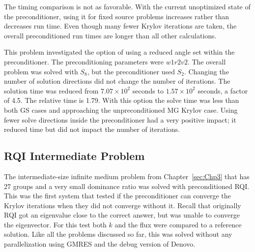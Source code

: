 The timing comparison is not as favorable. With the current unoptimized state of the preconditioner, using it for fixed source problems increases rather than decreases run time. Even though many fewer Krylov iterations are taken, the overall preconditioned run times are longer than all other calculations. 

This problem investigated the option of using a reduced angle set within the preconditioner. The preconditioning parameters were $w1r2v2$. The overall problem was solved with $S_{8}$, but the preconditioner used $S_{2}$. Changing the number of solution directions did not change the number of iterations. The solution time was reduced from $7.07 \times 10^{2}$ seconds to $1.57 \times 10^{2}$ seconds, a factor of 4.5. The relative time is 1.79. With this option the solve time was less than both GS cases and approaching the unpreconditioned MG Krylov case. Using fewer solve directions inside the preconditioner had a very positive impact; it reduced time but did not impact the number of iterations.

\subsection{RQI Intermediate Problem}
The intermediate-size infinite medium problem from Chapter~\ref{sec:Chp3} that has 27 groups and a very small dominance ratio was solved with preconditioned RQI. This was the first system that tested if the preconditioner can converge the Krylov iterations when they did not converge without it. Recall that originally RQI got an eigenvalue close to the correct answer, but was unable to converge the eigenvector. For this test both $k$ and the flux were compared to a reference solution. Like all the problems discussed so far, this was solved without any parallelization using GMRES and the debug version of Denovo. 

